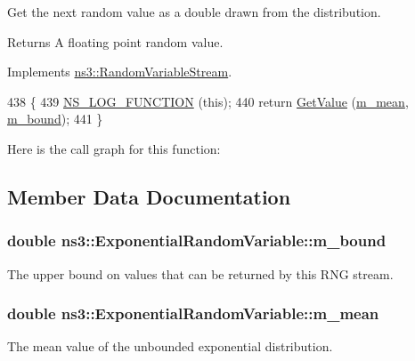 Get the next random value as a double drawn from the distribution. 

\begin{DoxyReturn}{Returns}
A floating point random value. 
\end{DoxyReturn}


Implements \hyperlink{classns3_1_1RandomVariableStream_a4fa5944dc4cb11544e661ed23072b36c}{ns3\+::\+Random\+Variable\+Stream}.


\begin{DoxyCode}
438 \{
439   \hyperlink{log-macros-disabled_8h_a90b90d5bad1f39cb1b64923ea94c0761}{NS\_LOG\_FUNCTION} (\textcolor{keyword}{this});
440   \textcolor{keywordflow}{return} \hyperlink{classns3_1_1ExponentialRandomVariable_acac3b8014e1ae17e009ceb876d733c5f}{GetValue} (\hyperlink{classns3_1_1ExponentialRandomVariable_a8af9234fcf986a6dfe67e43c3b83db1d}{m\_mean}, \hyperlink{classns3_1_1ExponentialRandomVariable_a90e6d366c4a2c66ccf78268f75112290}{m\_bound});
441 \}
\end{DoxyCode}


Here is the call graph for this function\+:




\subsection{Member Data Documentation}
\subsubsection[{\texorpdfstring{m\+\_\+bound}{m_bound}}]{\setlength{\rightskip}{0pt plus 5cm}double ns3\+::\+Exponential\+Random\+Variable\+::m\+\_\+bound\hspace{0.3cm}{\ttfamily [private]}}\hypertarget{classns3_1_1ExponentialRandomVariable_a90e6d366c4a2c66ccf78268f75112290}{}\label{classns3_1_1ExponentialRandomVariable_a90e6d366c4a2c66ccf78268f75112290}
The upper bound on values that can be returned by this R\+NG stream. 
\subsubsection[{\texorpdfstring{m\+\_\+mean}{m_mean}}]{\setlength{\rightskip}{0pt plus 5cm}double ns3\+::\+Exponential\+Random\+Variable\+::m\+\_\+mean\hspace{0.3cm}{\ttfamily [private]}}\hypertarget{classns3_1_1ExponentialRandomVariable_a8af9234fcf986a6dfe67e43c3b83db1d}{}\label{classns3_1_1ExponentialRandomVariable_a8af9234fcf986a6dfe67e43c3b83db1d}
The mean value of the unbounded exponential distribution. 

